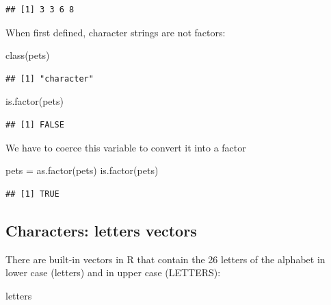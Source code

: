 \documentclass[
]{book}
\newenvironment{Shaded}{\begin{snugshade}}{\end{snugshade}}
\newcommand{\FunctionTok}[1]{\textcolor[rgb]{0.00,0.00,0.00}{#1}}
\newcommand{\NormalTok}[1]{#1}
\newcommand{\OtherTok}[1]{\textcolor[rgb]{0.56,0.35,0.01}{#1}}
\begin{document}
\begin{verbatim}
## [1] 3 3 6 8
\end{verbatim}

When first defined, character strings are not factors:

\begin{Shaded}
\begin{Highlighting}[]
\FunctionTok{class}\NormalTok{(pets)}
\end{Highlighting}
\end{Shaded}

\begin{verbatim}
## [1] "character"
\end{verbatim}

\begin{Shaded}
\begin{Highlighting}[]
\FunctionTok{is.factor}\NormalTok{(pets)}
\end{Highlighting}
\end{Shaded}

\begin{verbatim}
## [1] FALSE
\end{verbatim}

We have to coerce this variable to convert it into a factor

\begin{Shaded}
\begin{Highlighting}[]
\NormalTok{pets }\OtherTok{=} \FunctionTok{as.factor}\NormalTok{(pets)}
\FunctionTok{is.factor}\NormalTok{(pets)}
\end{Highlighting}
\end{Shaded}

\begin{verbatim}
## [1] TRUE
\end{verbatim}

\hypertarget{characters-letters-vectors}{%
\subsection{Characters: letters vectors}\label{characters-letters-vectors}}

There are built-in vectors in R that contain the 26 letters of the alphabet in lower case (letters) and in upper
case (LETTERS):

\begin{Shaded}
\begin{Highlighting}[]
\NormalTok{letters}
\end{Highlighting}
\end{Shaded}
\end{document}
